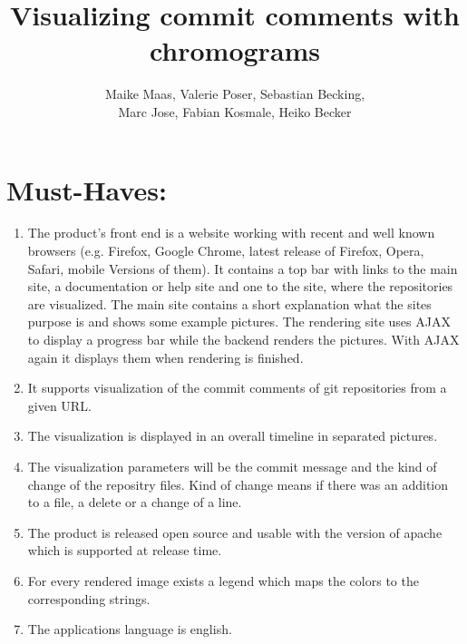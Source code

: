 \documentclass[10pt]{scrartcl}
\author{Maike Maas, Valerie Poser, Sebastian Becking,\\
Marc Jose, Fabian Kosmale, Heiko Becker}
\title{Visualizing commit comments with chromograms}
\begin{document}
\maketitle
\section{Must-Haves:}
\begin{enumerate}
\item The product's front end is a website working with recent and well known browsers (e.g. Firefox, Google Chrome, latest release of Firefox, Opera, Safari, mobile Versions of them). It contains a top bar with links to the main site, a documentation or help site and one to the site, where the repositories are visualized. The main site contains a short explanation what the sites purpose is and shows some example pictures. The rendering site uses AJAX to display a progress bar while the backend renders the pictures. With AJAX again it displays them when rendering is finished.
\item It supports visualization of the commit comments of git repositories from a given URL. 
\item The visualization is displayed in an overall timeline in separated pictures.
\item The visualization parameters will be the commit message and the kind of change of the repositry files. Kind of change means if there was an addition to a file, a delete or a change of a line.
\item The product is released open source and usable with the version of apache which is supported at release time.
\item For every rendered image exists a legend which maps the colors to the corresponding strings.
\item The applications language is english.
\end{enumerate}
\end{document}
